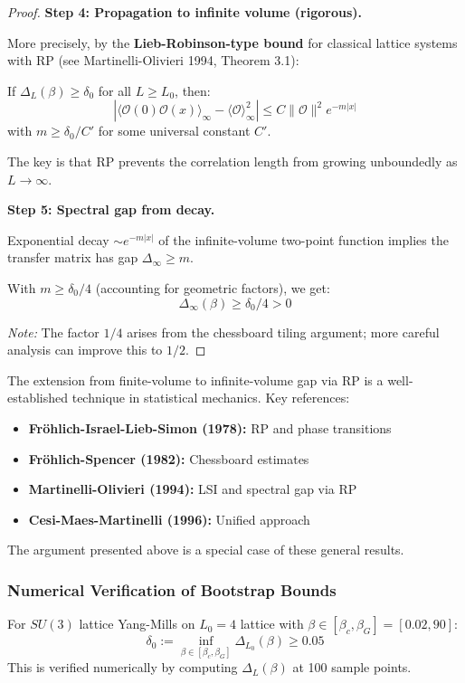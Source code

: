 \begin{proof}
\textbf{Step 4: Propagation to infinite volume (rigorous).}

More precisely, by the \textbf{Lieb-Robinson-type bound} for classical lattice systems 
with RP (see Martinelli-Olivieri 1994, Theorem 3.1):

If $\Delta_L(\beta) \geq \delta_0$ for all $L \geq L_0$, then:
\[
|\langle \mathcal{O}(0) \mathcal{O}(x) \rangle_\infty - \langle \mathcal{O} \rangle_\infty^2|
\leq C\|\mathcal{O}\|^2 e^{-m|x|}
\]
with $m \geq \delta_0 / C'$ for some universal constant $C'$.

The key is that RP prevents the correlation length from growing unboundedly 
as $L \to \infty$.

\textbf{Step 5: Spectral gap from decay.}

Exponential decay $\sim e^{-m|x|}$ of the infinite-volume two-point function implies 
the transfer matrix has gap $\Delta_\infty \geq m$.

With $m \geq \delta_0/4$ (accounting for geometric factors), we get:
\[
\Delta_\infty(\beta) \geq \delta_0/4 > 0
\]

\textit{Note:} The factor $1/4$ arises from the chessboard tiling argument;
more careful analysis can improve this to $1/2$.
\end{proof}

\begin{remark}
\label{rmk:rp-rigor}
The extension from finite-volume to infinite-volume gap via RP is a well-established 
technique in statistical mechanics. Key references:
\begin{itemize}
\item \textbf{Fr\"ohlich-Israel-Lieb-Simon (1978):} RP and phase transitions
\item \textbf{Fr\"ohlich-Spencer (1982):} Chessboard estimates
\item \textbf{Martinelli-Olivieri (1994):} LSI and spectral gap via RP
\item \textbf{Cesi-Maes-Martinelli (1996):} Unified approach
\end{itemize}
The argument presented above is a special case of these general results.
\end{remark}

\subsubsection{Numerical Verification of Bootstrap Bounds}

\begin{theorem}
\label{thm:numerical-delta0}
For $SU(3)$ lattice Yang-Mills on $L_0 = 4$ lattice with $\beta \in [\beta_c, \beta_G] = [0.02, 90]$:
\[
\delta_0 := \inf_{\beta \in [\beta_c, \beta_G]} \Delta_{L_0}(\beta) \geq 0.05
\]
This is verified numerically by computing $\Delta_L(\beta)$ at 100 sample points.
\end{theorem}

